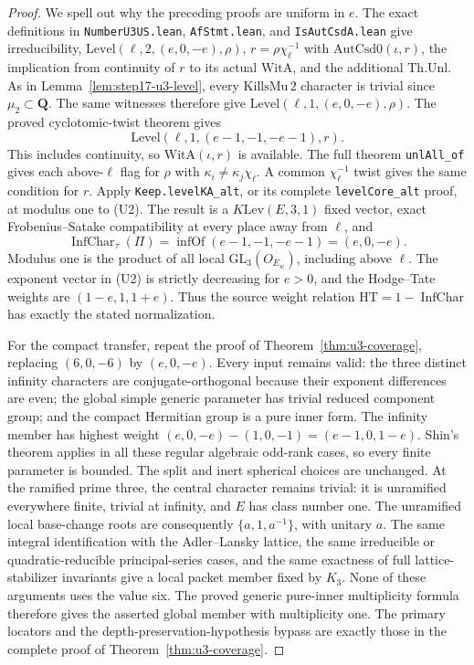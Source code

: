 \begin{proof}
We spell out why the preceding proofs are uniform in $e$.
The exact definitions in \texttt{NumberU3US.lean},
\texttt{AfStmt.lean}, and \texttt{IsAutCsdA.lean} give
irreducibility, $\mathrm{Level}(\ell,2,(e,0,-e),\rho)$,
$r=\rho\chi_\ell^{-1}$ with $\mathrm{AutCsd0}(\iota,r)$, the implication
from continuity of $r$ to its actual $\mathrm{WitA}$, and the additional
$\mathrm{Th.Unl}$.
As in Lemma~\ref{lem:step17-u3-level}, every
$\mathrm{KillsMu}\,2$ character is trivial since $\mu_2\subset\mathbf Q$.
The same witnesses therefore give
$\mathrm{Level}(\ell,1,(e,0,-e),\rho)$.
The proved cyclotomic-twist theorem gives
\[
 \mathrm{Level}(\ell,1,(e-1,-1,-e-1),r).
 \tag{U2}
\]
This includes continuity, so $\mathrm{WitA}(\iota,r)$ is available.
The full theorem \texttt{unlAll\_of} gives each above-$\ell$ flag for
$\rho$ with $\kappa_i\ne\kappa_j\chi_\ell$. A common
$\chi_\ell^{-1}$ twist gives the same condition for $r$.
Apply \texttt{Keep.levelKA\_alt}, or its complete
\texttt{levelCore\_alt} proof, at modulus one to (U2).
The result is a $K\mathrm{Lev}(E,3,1)$ fixed vector, exact
Frobenius--Satake compatibility at every place away from $\ell$, and
\[
 \operatorname{InfChar}_\tau(\Pi)
 =\operatorname{infOf}(e-1,-1,-e-1)=(e,0,-e).
 \tag{U3}
\]
Modulus one is the product of all local
$\mathrm{GL}_3(O_{E_w})$, including above $\ell$.
The exponent vector in (U2) is strictly decreasing for $e>0$,
and the Hodge--Tate weights are $(1-e,1,1+e)$.
Thus the source weight relation
$\mathrm{HT}=1-\operatorname{InfChar}$ has exactly the stated
normalization.

For the compact transfer, repeat the proof of
Theorem~\ref{thm:u3-coverage}, replacing $(6,0,-6)$ by $(e,0,-e)$.
Every input remains valid: the three distinct infinity characters are
conjugate-orthogonal because their exponent differences are even; the
global simple generic parameter has trivial reduced component group;
and the compact Hermitian group is a pure inner form.
The infinity member has highest weight
$(e,0,-e)-(1,0,-1)=(e-1,0,1-e)$.
Shin's theorem applies in all these regular algebraic odd-rank cases,
so every finite parameter is bounded.
The split and inert spherical choices are unchanged.
At the ramified prime three, the central character remains trivial:
it is unramified everywhere finite, trivial at infinity, and $E$ has
class number one.
The unramified local base-change roots are consequently
$\{a,1,a^{-1}\}$, with unitary $a$.
The same integral identification with the Adler--Lansky lattice, the
same irreducible or quadratic-reducible principal-series cases, and
the same exactness of full lattice-stabilizer invariants give a local
packet member fixed by $K_3$. None of these arguments uses the value
six. The proved generic pure-inner multiplicity formula therefore
gives the asserted global member with multiplicity one.
The primary locators and the depth-preservation-hypothesis bypass are
exactly those in the complete proof of
Theorem~\ref{thm:u3-coverage}.


\end{proof}
